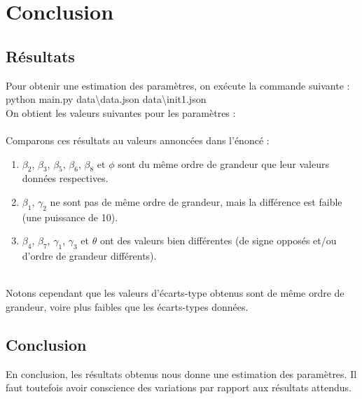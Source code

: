 \section{Conclusion}
\subsection{Résultats}
Pour obtenir une estimation des paramètres, on exécute la commande suivante :  \\
python main.py data\textbackslash data.json data\textbackslash init1.json \\
On obtient les valeurs suivantes pour les paramètres : \\
     \\

Comparons ces résultats au valeurs annoncées dans l'énoncé :
\begin{enumerate}
    \item $\beta_{2}$,  $\beta_{3}$,  $\beta_{5}$, $\beta_{6}$, $\beta_{8}$ et $\phi$ sont du même ordre de grandeur que leur valeurs données respectives.
    \item $\beta_{1}$, $\gamma_{2}$ ne sont pas de même ordre de grandeur, mais la différence est faible (une puissance de 10).
    \item $\beta_{4}$, $\beta_{7}$, $\gamma_{1}$, $\gamma_{3}$ et $\theta$ ont des valeurs bien différentes (de signe opposés et/ou d'ordre de grandeur différents).
\end{enumerate}
\\
Notons cependant que les valeurs d'écarts-type obtenus sont de même ordre de grandeur, voire plus faibles que les écarts-types données.
\subsection{Conclusion}

En conclusion, les résultats obtenus nous donne une estimation des paramètres. Il faut toutefois avoir conscience des variations par rapport aux résultats attendus.